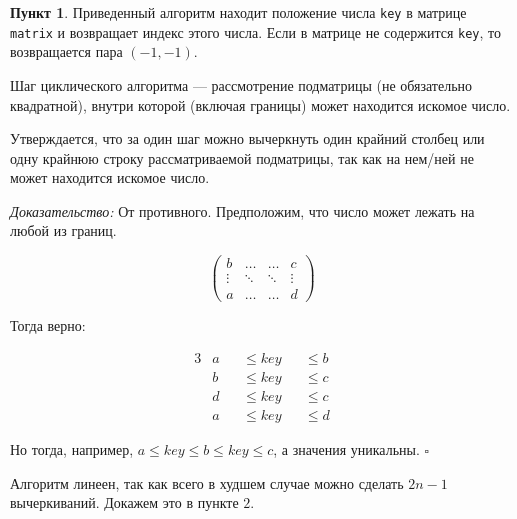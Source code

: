 \documentclass[11pt,a4paper]{scrarticle}
\theoremstyle{definition}
\newtheorem{subtask}{Пункт}
\begin{document}
\begin{subtask}
	Приведенный алгоритм находит положение числа \texttt{key} в матрице \texttt{matrix} и возвращает индекс этого числа. Если в матрице не содержится \texttt{key}, то возвращается пара $(-1, -1)$.

	Шаг циклического алгоритма --- рассмотрение подматрицы (не обязательно квадратной), внутри которой (включая границы) может находится искомое число.

	Утверждается, что за один шаг можно вычеркнуть один крайний столбец или одну крайнюю строку рассматриваемой подматрицы, так как на нем/ней не может находится искомое число.

	\emph{Доказательство:} От противного. Предположим, что число может лежать на любой из границ.

	$$
		\begin{pmatrix}
			b      & \dots  & \dots  & c      \\
			\vdots & \ddots & \ddots & \vdots \\
			a      & \dots  & \dots  & d
		\end{pmatrix}
	$$

	Тогда верно:

	\begin{alignat*}{3}
		 & a &  & \le key &  & \le b \\
		 & b &  & \le key &  & \le c \\
		 & d &  & \le key &  & \le c \\
		 & a &  & \le key &  & \le d
	\end{alignat*}

	Но тогда, например, $a \le key \le b \le key \le c$, а значения уникальны. $\square$
	\pagebreak

	Алгоритм линеен, так как всего в худшем случае можно сделать $2n - 1$ вычеркиваний. Докажем это в пункте $2$.
\end{subtask}
\end{document}
